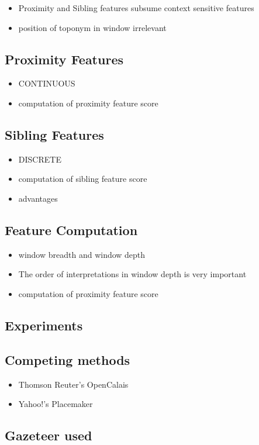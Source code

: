 \documentclass[
     11pt,         %
     a4paper,      %
     oneside,
     ]{article}
\begin{document}
\begin{itemize}
	\item Proximity and Sibling features subsume context sensitive features
	\item position of toponym in window irrelevant
\end{itemize}
\subsection{Proximity Features}
\begin{itemize}
	\item CONTINUOUS
	\item computation of proximity feature score
\end{itemize}
\subsection{Sibling Features}
\begin{itemize}
	\item DISCRETE
	\item computation of sibling feature score
	\item advantages
\end{itemize}
\subsection{Feature Computation}
\begin{itemize}
	\item window breadth and window depth
	\item The order of interpretations in window depth is very important
	\item computation of proximity feature score
\end{itemize}

\subsection{Experiments}
\subsection{Competing methods}
\begin{itemize}
	\item Thomson Reuter's OpenCalais
	\item Yahoo!'s Placemaker
\end{itemize}
\subsection{Gazeteer used}
\end{document}
